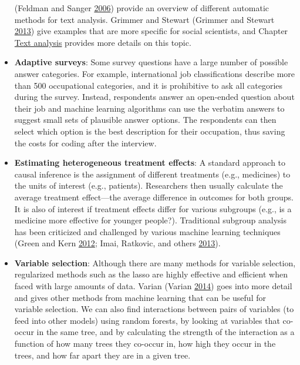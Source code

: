\documentclass[]{krantz}
\begin{document}
\begin{itemize}
  (Feldman and Sanger \protect\hyperlink{ref-FeldmanSanger}{2006})
  provide an overview of different automatic methods for text analysis.
  Grimmer and Stewart (Grimmer and Stewart
  \protect\hyperlink{ref-grimmer2013text}{2013}) give examples that are
  more specific for social scientists, and Chapter
  \protect\hyperlink{chap:text}{Text analysis} provides more details on
  this topic.
\item
  \textbf{Adaptive surveys}: Some survey questions have a large number
  of possible answer categories. For example, international job
  classifications describe more than 500 occupational categories, and it
  is prohibitive to ask all categories during the survey. Instead,
  respondents answer an open-ended question about their job and machine
  learning algorithms can use the verbatim answers to suggest small sets
  of plausible answer options. The respondents can then select which
  option is the best description for their occupation, thus saving the
  costs for coding after the interview.
\item
  \textbf{Estimating heterogeneous treatment effects}: A standard
  approach to causal inference is the assignment of different treatments
  (e.g., medicines) to the units of interest (e.g., patients).
  Researchers then usually calculate the average treatment effect---the
  average difference in outcomes for both groups. It is also of interest
  if treatment effects differ for various subgroups (e.g., is a medicine
  more effective for younger people?). Traditional subgroup analysis has
  been criticized and challenged by various machine learning techniques
  (Green and Kern \protect\hyperlink{ref-green2012modeling}{2012}; Imai,
  Ratkovic, and others
  \protect\hyperlink{ref-imai2013estimating}{2013}).
\item
  \textbf{Variable selection}: Although there are many methods for
  variable selection, regularized methods such as the lasso are highly
  effective and efficient when faced with large amounts of data. Varian
  (Varian \protect\hyperlink{ref-Varian2014}{2014}) goes into more
  detail and gives other methods from machine learning that can be
  useful for variable selection. We can also find interactions between
  pairs of variables (to feed into other models) using random forests,
  by looking at variables that co-occur in the same tree, and by
  calculating the strength of the interaction as a function of how many
  trees they co-occur in, how high they occur in the trees, and how far
  apart they are in a given tree.
\end{itemize}
\end{document}
